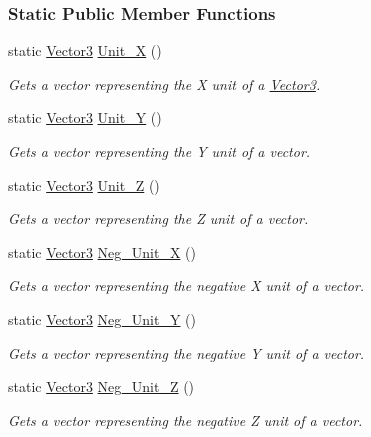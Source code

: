 \subsubsection*{Static Public Member Functions}
\begin{DoxyCompactItemize}
\item 
static \hyperlink{classphys_1_1Vector3}{Vector3} \hyperlink{classphys_1_1Vector3_aa2f573233982cb27cb05e5bfe38b327e}{Unit\_\-X} ()
\begin{DoxyCompactList}\small\item\em Gets a vector representing the X unit of a \hyperlink{classphys_1_1Vector3}{Vector3}. \item\end{DoxyCompactList}\item 
static \hyperlink{classphys_1_1Vector3}{Vector3} \hyperlink{classphys_1_1Vector3_ab9d8ea65d744278a87aeeeea059d5895}{Unit\_\-Y} ()
\begin{DoxyCompactList}\small\item\em Gets a vector representing the Y unit of a vector. \item\end{DoxyCompactList}\item 
static \hyperlink{classphys_1_1Vector3}{Vector3} \hyperlink{classphys_1_1Vector3_a9c25ec99cf982fe28eeaff4ddfc67715}{Unit\_\-Z} ()
\begin{DoxyCompactList}\small\item\em Gets a vector representing the Z unit of a vector. \item\end{DoxyCompactList}\item 
static \hyperlink{classphys_1_1Vector3}{Vector3} \hyperlink{classphys_1_1Vector3_aa94ab8ce5d5cab51a4c2ef1e78430731}{Neg\_\-Unit\_\-X} ()
\begin{DoxyCompactList}\small\item\em Gets a vector representing the negative X unit of a vector. \item\end{DoxyCompactList}\item 
static \hyperlink{classphys_1_1Vector3}{Vector3} \hyperlink{classphys_1_1Vector3_a0ac8b5f2e0d28de9294502c1e4391b8c}{Neg\_\-Unit\_\-Y} ()
\begin{DoxyCompactList}\small\item\em Gets a vector representing the negative Y unit of a vector. \item\end{DoxyCompactList}\item 
static \hyperlink{classphys_1_1Vector3}{Vector3} \hyperlink{classphys_1_1Vector3_a2e5bc13758eaa6a45ae45fbb9df0c732}{Neg\_\-Unit\_\-Z} ()
\begin{DoxyCompactList}\small\item\em Gets a vector representing the negative Z unit of a vector. \item\end{DoxyCompactList}\end{DoxyCompactItemize}
